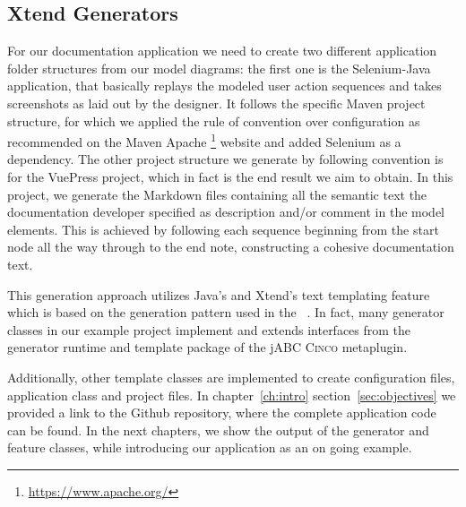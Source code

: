 \subsection{Xtend Generators}\label{sec:GEN}

For our documentation application we need to create two different application folder structures from our model diagrams: the first one is the Selenium-Java application, that basically replays the modeled user action sequences and takes screenshots as laid out by the designer. It follows the specific Maven project structure, for which we applied the rule of convention over configuration as recommended on the Maven Apache \footnote[1]{\url{https://www.apache.org/}} website and added Selenium as a dependency. The other project structure we generate by following convention is for the VuePress project, which in fact is the end result we aim to obtain. In this project, we generate the Markdown files containing all the semantic text the documentation developer specified as description and/or comment in the model elements. This is achieved by following each sequence beginning from the start node all the way through to the end note, constructing a cohesive documentation text.

This generation approach utilizes Java's and Xtend's text templating feature which is based on the generation pattern used in the ~\cite{model-driver-dev_jABC,jabc-home}. In fact, many generator classes in our example project implement and extends interfaces from the generator runtime and template package of the jABC \textsc{Cinco} metaplugin.

Additionally, other template classes are implemented to create configuration files, application class and project files. In chapter~\ref{ch:intro} section~\ref{sec:objectives} we provided a link to the Github repository, where the complete application code can be found. In the next chapters, we show the output of the generator and feature classes, while introducing our application as an on going example.